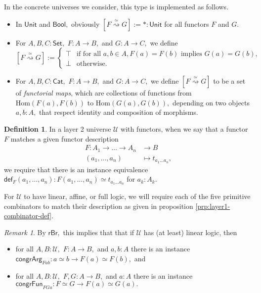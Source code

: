 \documentclass[a4paper]{article}
\theoremstyle{definition}
\newtheorem{definition}{Definition}[section]
\theoremstyle{remark}
\newtheorem*{remark}{Remark}
\newcommand{\defn}{\emph}
\renewcommand{\equiv}{\simeq}
\newcommand{\equivto}{\overset{\equiv}{\rightsquigarrow}}
\newcommand{\U}{\mathcal{U}}
\newcommand{\nm}{\mathsf}
\newcommand{\universe}{\nm}
\newcommand{\Unit}{\universe{Unit}}
\newcommand{\Bool}{\universe{Bool}}
\newcommand{\Set}{\universe{Set}}
\newcommand{\Cat}{\universe{Cat}}
\newcommand{\Hom}{\mathrm{Hom}}
\newcommand{\congrArg}{\nm{congrArg}}
\newcommand{\congrFun}{\nm{congrFun}}
\newcommand{\fndef}[1]{\nm{def}_{#1}}
\begin{document}
In the concrete universes we consider, this type is implemented as follows.
\begin{itemize}
  \item In $\Unit$ and $\Bool,$ obviously $[F \equivto G] := \ast : \Unit$ for all functors $F$ and
  $G.$
  \item For $A,B,C : \Set,$ $F : A \to B,$ and $G : A \to C,$ we define
  \[[F \equivto G] := \begin{cases}
    \top & \text{if for all } a,b \in A, F(a) = F(b) \text{ implies } G(a) = G(b),\\
    \bot & \text{otherwise.}
  \end{cases}\]
  \item For $A,B,C : \Cat,$ $F : A \to B,$ and $G : A \to C,$ we define $[F \equivto G]$ to be a
  set of \defn{functorial maps}, which are collections of functions from $\Hom(F(a),F(b))$ to
  $\Hom(G(a),G(b)),$ depending on two objects $a,b : A,$ that respect identity and composition of
  morphisms.
\end{itemize}

\begin{definition}
  In a layer 2 universe $\U$ with functors, when we say that a functor $F$ matches a given functor
  description
  \begin{align*}
    F : A_1 \to \dots \to A_n &\to     B\\
        (a_1,\dots,a_n)       &\mapsto t_{a_1 \dots a_n},
  \end{align*}
  we require that there is an instance equivalence
  $\fndef{F}(a_1,\dots,a_n) : F(a_1,\dots,a_n) \equiv t_{a_1 \dots a_n}$ for $a_k : A_k.$
\end{definition}

For $\U$ to have linear, affine, or full logic, we will require each of the five primitive
combinators to match their description as given in proposition \ref{prp:layer1-combinator-def}.

\begin{remark}
  By $\nm{rBr},$ this implies that that if $\U$ has (at least) linear logic, then
  \begin{itemize}
    \item for all $A,B : \U,$ $F : A \to B,$ and $a,b : A$ there is an instance\\
    $\congrArg_{Fab} : a \equiv b \to F(a) \equiv F(b),$ and
    \item for all $A,B : \U,$ $F,G : A \to B,$ and $a : A$ there is an instance\\
    $\congrFun_{FGa} : F \equiv G \to F(a) \equiv G(a).$
  \end{itemize}
\end{remark}
\end{document}
